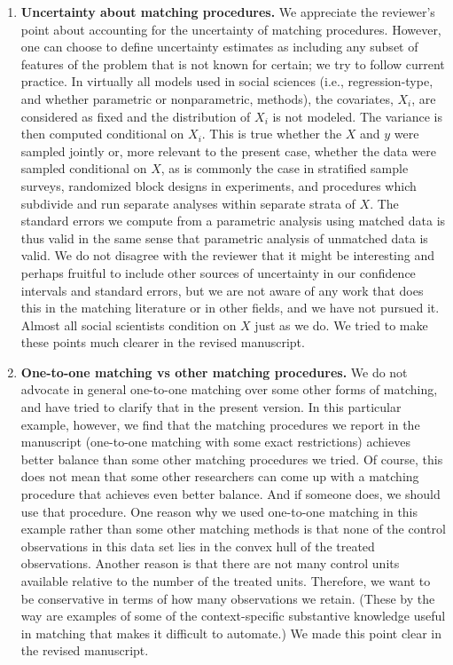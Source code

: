 \documentclass[11pt]{article}
\begin{document}
\begin{enumerate}
\item {\bf Uncertainty about matching procedures.} We appreciate the
  reviewer's point about accounting for the uncertainty of matching
  procedures.  However, one can choose to define uncertainty estimates
  as including any subset of features of the problem that is not known
  for certain; we try to follow current practice.  In virtually all
  models used in social sciences (i.e., regression-type, and whether
  parametric or nonparametric, methods), the covariates, $X_i$, are
  considered as fixed and the distribution of $X_i$ is not modeled.
  The variance is then computed conditional on $X_i$.  This is true
  whether the $X$ and $y$ were sampled jointly or, more relevant to
  the present case, whether the data were sampled conditional on $X$,
  as is commonly the case in stratified sample surveys, randomized
  block designs in experiments, and procedures which subdivide and run
  separate analyses within separate strata of $X$.  The standard
  errors we compute from a parametric analysis using matched data is
  thus valid in the same sense that parametric analysis of unmatched
  data is valid.  We do not disagree with the reviewer that it might
  be interesting and perhaps fruitful to include other sources of
  uncertainty in our confidence intervals and standard errors, but we
  are not aware of any work that does this in the matching literature
  or in other fields, and we have not pursued it.  Almost all social
  scientists condition on $X$ just as we do.  We tried to make these
  points much clearer in the revised manuscript.
  
\item {\bf One-to-one matching vs other matching procedures.} We do
  not advocate in general one-to-one matching over some other forms of
  matching, and have tried to clarify that in the present version. In
  this particular example, however, we find that the matching
  procedures we report in the manuscript (one-to-one matching with
  some exact restrictions) achieves better balance than some other
  matching procedures we tried. Of course, this does not mean that
  some other researchers can come up with a matching procedure that
  achieves even better balance. And if someone does, we should use
  that procedure. One reason why we used one-to-one matching in this
  example rather than some other matching methods is that none of the
  control observations in this data set lies in the convex hull of the
  treated observations. Another reason is that there are not many
  control units available relative to the number of the treated units.
  Therefore, we want to be conservative in terms of how many
  observations we retain.  (These by the way are examples of some of
  the context-specific substantive knowledge useful in matching that
  makes it difficult to automate.) We made this point clear in the
  revised manuscript.


\end{enumerate}
\end{document}
